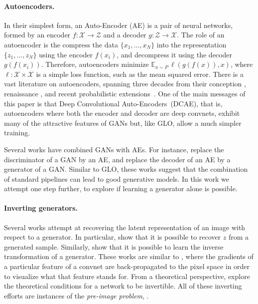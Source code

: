 \documentclass{article}
\newcommand{\GNAT}{GLO}
\begin{document}
\paragraph{Autoencoders.}
In their simplest form, an Auto-Encoder (AE) is a pair of neural networks, formed by
an encoder $f : \mathcal{X} \to \mathcal{Z}$ and a decoder $g : \mathcal{Z} \to
\mathcal{X}$. The role of an autoencoder is the compress the data $\{x_1,
\ldots, x_N\}$ into the representation $\{z_1, \ldots, z_N\}$ using the encoder
$f(x_i)$, and decompress it using the decoder $g(f(x_i))$. Therefore,
autoencoders minimize
$\mathbb{E}_{x \sim P}\,\ell(g(f(x)), x)$,
where $\ell : \mathcal{X} \times \mathcal{X}$ is a simple loss function, such
as the mean squared error.  There is a vast literature on autoencoders,
spanning three decades from their conception \citep{boulard_ae,
baldi1989neural}, renaissance \citep{hinton_science}, and
recent
probabilistic extensions~\citep{vincent2008extracting,kingma2013auto}.
One of the main messages of this paper is that Deep Convolutional Auto-Encoders~(DCAE),
that is, autoencoders where both the encoder and decoder are deep convnets,
exhibit many of the attractive features of GANs but, like \GNAT{}, allow a much
simpler training.

Several works have combined GANs with AEs. For instance, \citet{zhao2016energy}
replace the discriminator of a GAN by an AE, and \citet{adversarial_generator}
replace the decoder of an AE by a generator of a GAN.  Similar to \GNAT{},
these works suggest that the combination of standard pipelines can lead to good
generative models. In this work we attempt one step further, to
explore if learning a generator alone is possible.

\paragraph{Inverting generators.}
Several works attempt at recovering the latent representation of an
image with respect to a generator.
In particular, \citet{precise_recovery, zhu2016generative}
show that it is possible to recover $z$ from a generated sample.
Similarly, \citet{inverting_generator} show that it is possible to learn the
inverse transformation of a generator.
These works are similar to \citep{visualizing_cnn}, where the gradients of a
particular feature of a convnet are back-propagated to the pixel space in order to
visualize what that feature stands for. From a theoretical perspective,
\citet{bruna2013signal} explore the theoretical conditions for a network to be
invertible.
All of these inverting efforts are instances of the \emph{pre-image problem},
\citep{kwok2004pre}.
\end{document}
